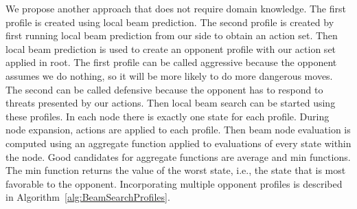 \documentclass[shortabstract, mgr, english]{iithesis}
\begin{document}
We propose another approach that does not require domain knowledge. The first profile is created using local beam prediction. The second profile is created by first running local beam prediction from our side to obtain an action set. Then local beam prediction is used to create an opponent profile with our action set applied in root. The first profile can be called aggressive because the opponent assumes we do nothing, so it will be more likely to do more dangerous moves. The second can be called defensive because the opponent has to respond to threats presented by our actions. Then local beam search can be started using these profiles. In each node there is exactly one state for each profile. During node expansion, actions are applied to each profile. Then beam node evaluation is computed using an aggregate function applied to evaluations of every state within the node. Good candidates for aggregate functions are average and min functions. The min function returns the value of the worst state, i.e., the state that is most favorable to the opponent. Incorporating multiple opponent profiles is described in Algorithm~\ref{alg:BeamSearchProfiles}.
\end{document}
